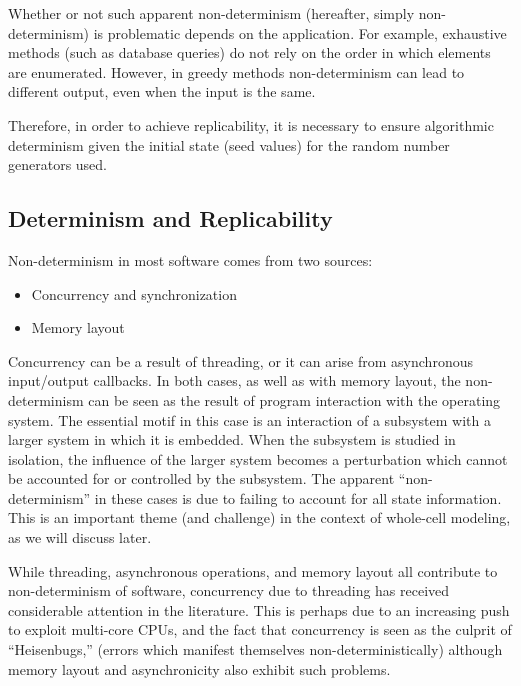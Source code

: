 \documentclass[journal,transmag,twoside]{IEEEtran}
\begin{document}
Whether or not such apparent non-determinism (hereafter, simply non-determinism)
is problematic depends on the application.
For example, exhaustive methods (such as database queries) do not rely on the order
in which elements are enumerated.
However, in greedy methods non-determinism can lead to different output, even
when the input is the same.

Therefore, in order to achieve replicability, it is necessary to ensure
algorithmic determinism given the initial state (seed values) for the random number generators used.

\subsection{Determinism and Replicability}

Non-determinism in most software comes from two sources:

\begin{itemize}
\item Concurrency and synchronization
\item Memory layout
\end{itemize}

Concurrency can be a result of threading, or it can arise from
asynchronous input/output callbacks. In both cases, as well as with memory layout,
the non-determinism
can be seen as the result
of program interaction with the operating system.
The essential motif in this case is an interaction of a subsystem
with a larger system in which it is embedded.
When the subsystem is studied in isolation, the influence of the larger
system becomes a perturbation which cannot be accounted for or controlled by
the subsystem. The apparent ``non-determinism'' in these cases
is due to failing to account for all state information.
This is an important theme (and challenge) in the context of whole-cell modeling,
as we will discuss later. %

While threading, asynchronous operations, and memory layout all contribute
to non-determinism of software,
concurrency due to threading has received considerable attention in the literature.
This is perhaps due to an increasing push to exploit multi-core CPUs,
and the fact that concurrency is seen as the culprit of ``Heisenbugs,''
(errors which manifest themselves non-deterministically)
although memory layout and asynchronicity also exhibit such problems.
\end{document}
